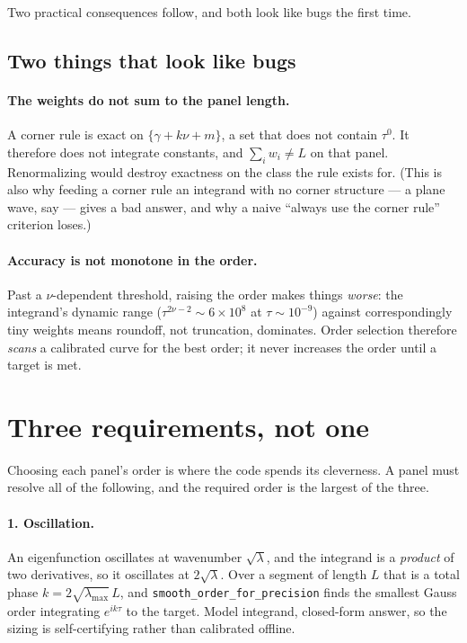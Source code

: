 \documentclass[11pt]{article}
\theoremstyle{definition}
\theoremstyle{remark}
\newcommand{\code}[1]{\texttt{#1}}
\begin{document}
Two practical consequences follow, and both look like bugs the first time.

\subsection{Two things that look like bugs}\label{sec:looks-like-bugs}

\paragraph{The weights do not sum to the panel length.} A corner rule is exact on
$\{\gamma+k\nu+m\}$, a set that does not contain $\tau^0$. It therefore does not
integrate constants, and $\sum_i w_i \ne L$ on that panel. Renormalizing would
destroy exactness on the class the rule exists for. (This is also why feeding a
corner rule an integrand with no corner structure --- a plane wave, say --- gives
a bad answer, and why a naive ``always use the corner rule'' criterion loses.)

\paragraph{Accuracy is not monotone in the order.} Past a $\nu$-dependent
threshold, raising the order makes things \emph{worse}: the integrand's dynamic
range ($\tau^{2\nu-2}\sim6\times10^8$ at $\tau\sim10^{-9}$) against
correspondingly tiny weights means roundoff, not truncation, dominates. Order
selection therefore \emph{scans} a calibrated curve for the best order; it never
increases the order until a target is met.

\section{Three requirements, not one}\label{sec:sizing}

Choosing each panel's order is where the code spends its cleverness. A panel must
resolve all of the following, and the required order is the largest of the three.

\paragraph{1. Oscillation.} An eigenfunction oscillates at wavenumber
$\sqrt\lambda$, and the integrand is a \emph{product} of two derivatives, so it
oscillates at $2\sqrt\lambda$. Over a segment of length $L$ that is a total phase
$k=2\sqrt{\lambda_{\max}}\,L$, and \code{smooth\_order\_for\_precision} finds the
smallest Gauss order integrating $e^{ik\tau}$ to the target. Model integrand,
closed-form answer, so the sizing is self-certifying rather than calibrated
offline.
\end{document}
